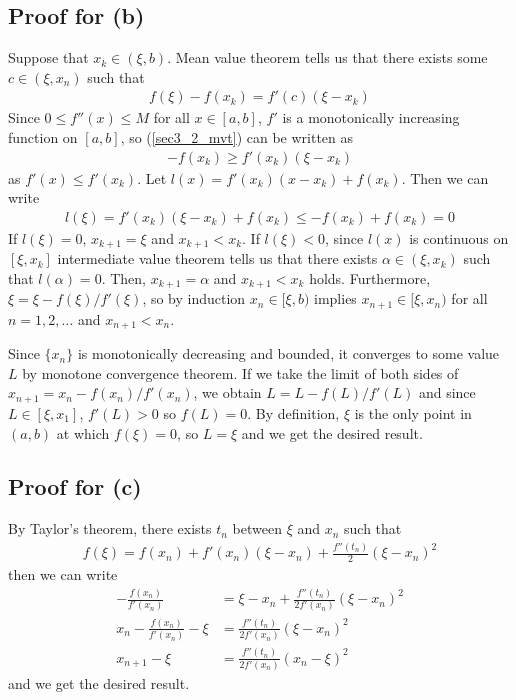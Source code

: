 \documentclass{scrartcl}
\begin{document}
\subsection{Proof for (b)}
Suppose that \(x_k \in (\xi, b)\).
Mean value theorem tells us that there exists some \(c \in (\xi, x_n)\) such that
\begin{align}\label{sec3_2_mvt}
  f(\xi) - f(x_k) = f'(c) (\xi - x_k)
\end{align}
Since \(0 \leq f''(x) \leq M\) for all \(x \in [a, b]\), \(f'\) is a monotonically increasing function on \([a, b]\), so (\ref{sec3_2_mvt}) can be written as
\begin{align*}
  -f(x_k) \geq f'(x_k) (\xi - x_k)
\end{align*}
as \(f'(x) \leq f'(x_k)\).
Let \(l(x) = f'(x_k) (x - x_k) + f(x_k)\).
Then we can write
\begin{align*}
  l(\xi) = f'(x_k) (\xi - x_k) + f(x_k) \leq -f(x_k) + f(x_k) = 0
\end{align*}
If \(l(\xi) = 0\), \(x_{k + 1} = \xi\) and \(x_{k + 1} < x_k\).
If \(l(\xi) < 0\), since \(l(x)\) is continuous on \([\xi, x_k]\) intermediate value theorem tells us that there exists \(\alpha \in (\xi, x_k)\) such that \(l(\alpha) = 0\).
Then, \(x_{k + 1} = \alpha\) and \(x_{k + 1} < x_k\) holds.
Furthermore, \(\xi = \xi - f(\xi) / f'(\xi)\), so by induction \(x_n \in [\xi, b)\) implies \(x_{n + 1} \in [\xi, x_n)\) for all \(n = 1, 2, \dots\) and \(x_{n + 1} < x_n\).

Since \(\{x_n\}\) is monotonically decreasing and bounded, it converges to some value \(L\) by monotone convergence theorem.
If we take the limit of both sides of \(x_{n + 1} = x_n - f(x_n) / f'(x_n)\), we obtain \(L = L - f(L) / f'(L)\) and since \(L \in [\xi, x_1]\), \(f'(L) > 0\) so \(f(L) = 0\).
By definition, \(\xi\) is the only point in \((a, b)\) at which \(f(\xi) = 0\), so \(L = \xi\) and we get the desired result.

\subsection{Proof for (c)}
By Taylor's theorem, there exists \(t_n\) between \(\xi\) and \(x_n\) such that
\begin{align*}
  f(\xi) = f(x_n) + f'(x_n) (\xi - x_n) + \frac{f''(t_n)}{2} (\xi - x_n)^2
\end{align*}
then we can write
\begin{align*}
  -\frac{f(x_n)}{f'(x_n)} &= \xi - x_n + \frac{f''(t_n)}{2f'(x_n)} (\xi - x_n)^2 \\
  x_n -\frac{f(x_n)}{f'(x_n)} - \xi &= \frac{f''(t_n)}{2f'(x_n)} (\xi - x_n)^2 \\
  x_{n + 1} - \xi &= \frac{f''(t_n)}{2f'(x_n)} (x_n - \xi)^2
\end{align*}
and we get the desired result.
\end{document}
